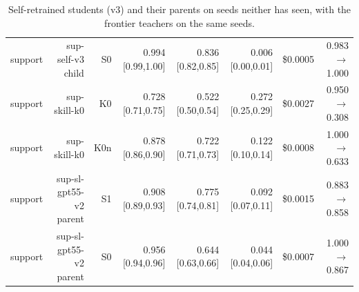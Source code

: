 \documentclass[11pt]{article}
\begin{document}
\begin{table}[H]
{\begin{tabular}{lrrrrrrr}
support & sup-self-v3 child & S0 & 0.994 [0.99,1.00] & 0.836 [0.82,0.85] & 0.006 [0.00,0.01] & \$0.0005 & 0.983 $\rightarrow$ 1.000 \\
support & sup-skill-k0 & K0 & 0.728 [0.71,0.75] & 0.522 [0.50,0.54] & 0.272 [0.25,0.29] & \$0.0027 & 0.950 $\rightarrow$ 0.308 \\
support & sup-skill-k0 & K0n & 0.878 [0.86,0.90] & 0.722 [0.71,0.73] & 0.122 [0.10,0.14] & \$0.0008 & 1.000 $\rightarrow$ 0.633 \\
support & sup-sl-gpt55-v2 parent & S1 & 0.908 [0.89,0.93] & 0.775 [0.74,0.81] & 0.092 [0.07,0.11] & \$0.0015 & 0.883 $\rightarrow$ 0.858 \\
support & sup-sl-gpt55-v2 parent & S0 & 0.956 [0.94,0.96] & 0.644 [0.63,0.66] & 0.044 [0.04,0.06] & \$0.0007 & 1.000 $\rightarrow$ 0.867 \\
\bottomrule
\end{tabular}
}
\caption{Self-retrained students (v3) and their parents on seeds neither has seen, with the frontier teachers on the same seeds.}
\label{tab:self}
\end{table}

\begin{table}[H]
\centering\scriptsize
{}
\caption{Child minus parent, paired by scenario, seed, fleet and episode; 95\% bootstrap intervals over cells.}
\label{tab:self-delta}
\end{table}
\end{document}
